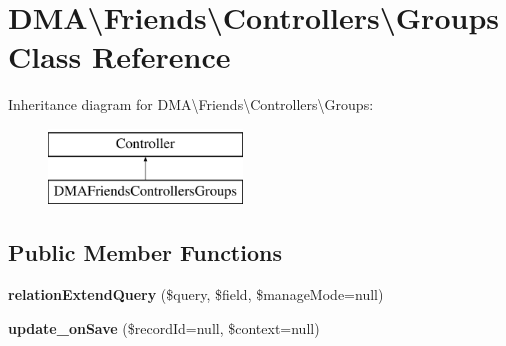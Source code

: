 \hypertarget{classDMA_1_1Friends_1_1Controllers_1_1Groups}{\section{D\+M\+A\textbackslash{}Friends\textbackslash{}Controllers\textbackslash{}Groups Class Reference}
\label{classDMA_1_1Friends_1_1Controllers_1_1Groups}
}
Inheritance diagram for D\+M\+A\textbackslash{}Friends\textbackslash{}Controllers\textbackslash{}Groups\+:\begin{figure}[H]
\begin{center}
\leavevmode
\includegraphics[height=2.000000cm]{d3/d59/classDMA_1_1Friends_1_1Controllers_1_1Groups}
\end{center}
\end{figure}
\subsection*{Public Member Functions}
\begin{DoxyCompactItemize}
\item 
\hypertarget{classDMA_1_1Friends_1_1Controllers_1_1Groups_ad413fbb0ad883ebc7a7faa208b70c0e9}{{\bfseries relation\+Extend\+Query} (\$query, \$field, \$manage\+Mode=null)}\label{classDMA_1_1Friends_1_1Controllers_1_1Groups_ad413fbb0ad883ebc7a7faa208b70c0e9}

\item 
\hypertarget{classDMA_1_1Friends_1_1Controllers_1_1Groups_a89cddf39d6b3998a33eb447b0715a58a}{{\bfseries update\+\_\+on\+Save} (\$record\+Id=null, \$context=null)}\label{classDMA_1_1Friends_1_1Controllers_1_1Groups_a89cddf39d6b3998a33eb447b0715a58a}

\end{DoxyCompactItemize}

